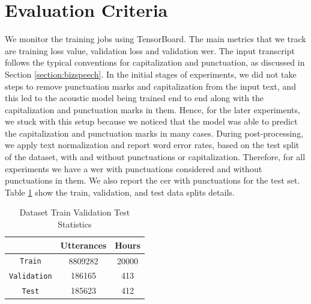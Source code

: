 \section{Evaluation Criteria}
\label{section:eval}
We monitor the training jobs using TensorBoard. The main metrics that we track are training loss value, validation loss and validation \acrshort{wer}. The input transcript follows the typical conventions for capitalization and punctuation, as discussed in Section \ref{section:bizspeech}. In the initial stages of experiments, we did not take steps to remove punctuation marks and capitalization from the input text, and this led to the acoustic model being trained end to end along with the capitalization and punctuation marks in them. Hence, for the later experiments, we stuck with this setup because we noticed that the model was able to predict the capitalization and punctuation marks in many cases. During post-processing, we apply text normalization and report word error rates, based on the test split of the dataset, with and without punctuations or capitalization. Therefore, for all experiments we have a \acrshort{wer} with punctuations considered and without punctuations in them. We also report the \acrlong{cer} with punctuations for the test set. Table \ref{table:splits} show the train, validation, and test data splits details.

\begin{table}[ht]
\centering
\begin{tabular}{ c | c  c }
\hline
  & Utterances & Hours \\
 \hline
 \verb|Train| & 8809282 & 20000 \\ 
 \verb|Validation| & 186165 & 413 \\ 
 \verb|Test| & 185623 & 412 \\ 
 \hline
\end{tabular}
\caption{\label{table:splits}Dataset Train Validation Test Statistics }
\end{table}


